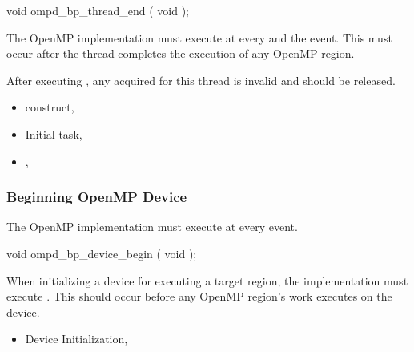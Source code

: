 \format
\begin{cspecific}
\begin{ompSyntax}
void ompd_bp_thread_end ( void );
\end{ompSyntax}
\end{cspecific}


\descr

The OpenMP implementation must execute 
 at every  and the  event.
This must occur after the thread completes the execution of any OpenMP region.

After 
executing , any  acquired for this thread 
is invalid and should be released.


\crossreferences
\begin{itemize}
\item
   construct, 
\item
  Initial task, 
\item
  , 
\end{itemize}






\subsubsection{Beginning OpenMP Device}
\label{subsubsec:ompd_bp_device_begin}

\summary
The OpenMP implementation must execute 
 at every  event.


\format
\begin{cspecific}
\begin{ompSyntax}
void ompd_bp_device_begin ( void );
\end{ompSyntax}
\end{cspecific}


\descr

When initializing a device for executing a target region, the implementation must 
execute .
This should occur before any OpenMP region's work executes on the device.

\crossreferences
\begin{itemize}
\item
  Device Initialization, 
\end{itemize}





